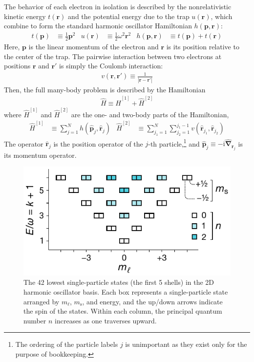 The behavior of each electron in isolation is described by the nonrelativistic kinetic energy $t(\bm{r})$ and the potential energy due to the trap $u(\bm{r})$, which combine to form the standard harmonic oscillator Hamiltonian $h(\bm{p}, \bm{r})$:
\begin{align*}
  t(\bm{p}) &\equiv \frac{1}{2} \bm{p}^2 &
  u(\bm{r}) &\equiv \frac{1}{2} \omega^2 \bm{r}^2 &
  h(\bm{p}, \bm{r}) &\equiv t(\bm{p}) + t(\bm{r})
\end{align*}
Here, $\bm{p}$ is the linear momentum of the electron and $\bm{r}$ is its position relative to the center of the trap.  The pairwise interaction between two electrons at positions $\bm{r}$ and $\bm{r}'$ is simply the Coulomb interaction:
\begin{align*}
  v(\bm{r}, \bm{r}') \equiv \frac{1}{|\bm{r} - \bm{r}'|}
\end{align*}
Then, the full many-body problem is described by the Hamiltonian
\begin{align*}
  \hat H \equiv \hat H^{[1]} + \hat H^{[2]}
\end{align*}
where $\hat{H}^{[1]}$ and $\hat{H}^{[2]}$ are the one- and two-body parts of the Hamiltonian,
\begin{align} \label{eq:onetwobodyhamiltonian}
\hat{H}^{[1]} &\equiv \sum_{j = 1}^N h(\hat{\bm p}_j, \hat{\bm r}_j) &
\hat{H}^{[2]} &\equiv \sum_{j_1 = 1}^N \sum_{j_2 = 1}^{j_1 - 1} v(\hat{\bm r}_{j_1}, \hat{\bm r}_{j_2})
\end{align}
The operator $\hat{\bm r}_j$ is the position operator of the $j$-th particle,\footnote{The ordering of the particle labels $j$ is unimportant as they exist only for the purpose of bookkeeping.} and $\hat{\bm p}_j \equiv -\mathrm{i} \hat{\bm{\nabla}}_{\bm{r}_j}$ is its momentum operator.

\begin{figure}
  \includegraphics{figures/fig-shell-structure-v2}
  \caption{The 42 lowest single-particle states (the first 5 shells) in the 2D harmonic oscillator basis.  Each box represents a single-particle state arranged by $m_\ell$, $m_{\mathrm{s}}$, and energy, and the up/down arrows indicate the spin of the states.  Within each column, the principal quantum number $n$ increases as one traverses upward.}
  \label{fig:shell-structure}
\end{figure}


